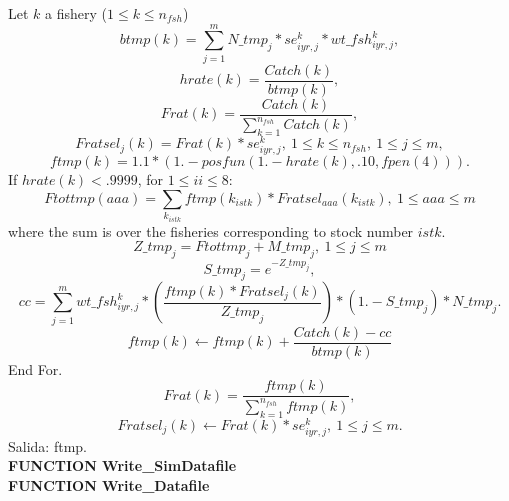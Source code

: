 \documentclass{article}
\begin{document}
Let $k$ a fishery ($1\leq k \leq n_{fsh}$)
\begin{equation}
    btmp(k)  =  \sum_{j=1}^mN\_tmp_j * se^k_{iyr,j} * wt\_fsh^k_{iyr,j},
\end{equation}
\begin{equation}
    hrate(k) = \dfrac{Catch(k)}{btmp(k)},
\end{equation}
\begin{equation}
    Frat(k)  = \dfrac{Catch(k)}{\sum_{k=1}^{n_{fsh}} Catch(k)},
\end{equation}
\begin{equation}
    Fratsel_j(k) = Frat(k)*se^k_{iyr,j}, \ 1\leq k \leq n_{fsh}, \ 1\leq j \leq m,
\end{equation}
\begin{equation}
    ftmp(k) = 1.1*(1.- posfun(1.-hrate(k),.10,fpen(4))).
\end{equation}
If $hrate(k)<.9999$, for $1\leq ii \leq 8$:
\begin{equation}
    Ftottmp(aaa)=\sum_{k_{istk}}ftmp(k_{istk})*Fratsel_{aaa}(k_{istk}), \ 1\leq aaa \leq m
\end{equation}
where the sum is over the fisheries corresponding to stock number $istk$.
\begin{equation}
    Z\_tmp_j     = Ftottmp_j  + M\_tmp_j, \ 1\leq j \leq m
\end{equation}
\begin{equation}
    S\_tmp_j     = e^{ -Z\_tmp_j },
\end{equation}
\begin{equation}
    cc = \sum_{j=1}^m wt\_fsh^k_{iyr,j} * \left(\dfrac{ftmp(k)*Fratsel_j(k)}{  Z\_tmp_j}\right)*(1.-S\_tmp_j)*N\_tmp_j.
\end{equation}
\begin{equation}
    ftmp(k) \leftarrow ftmp(k) + \dfrac{Catch(k)-cc}{btmp(k)}
\end{equation}
End For.
\begin{equation}
    Frat(k)=\dfrac{ftmp(k)}{\sum_{k=1}^{n_{fsh}}ftmp(k)},
\end{equation}
\begin{equation}
    Fratsel_j(k)\leftarrow Frat(k)*se^k_{iyr,j}, \ 1\leq j \leq m.
\end{equation}
Salida: ftmp.\\

\textbf{FUNCTION Write\_SimDatafile}\\
\textbf{FUNCTION Write\_Datafile}\\
\end{document}
